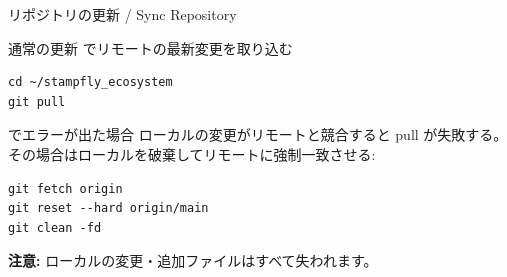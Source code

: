 \begin{frame}[fragile]{リポジトリの更新 / Sync Repository}
  \vspace{-0.3em}

  \begin{block}{通常の更新}
    {\small {} でリモートの最新変更を取り込む}
  \end{block}

  \vspace{-0.3em}

  \begin{lstlisting}[style=sfcpp]
cd ~/stampfly_ecosystem
git pull
  \end{lstlisting}

  \vspace{-0.2em}

  \begin{alertblock}{ でエラーが出た場合}
    {\footnotesize ローカルの変更がリモートと競合すると pull が失敗する。
    その場合はローカルを破棄してリモートに強制一致させる:}
  \end{alertblock}

  \vspace{-0.3em}

  \begin{lstlisting}[style=sfcpp]
git fetch origin
git reset --hard origin/main
git clean -fd
  \end{lstlisting}

  \vspace{-0.2em}

  {\scriptsize
  \textbf{注意:} ローカルの変更・追加ファイルはすべて失われます。
  }
\end{frame}
